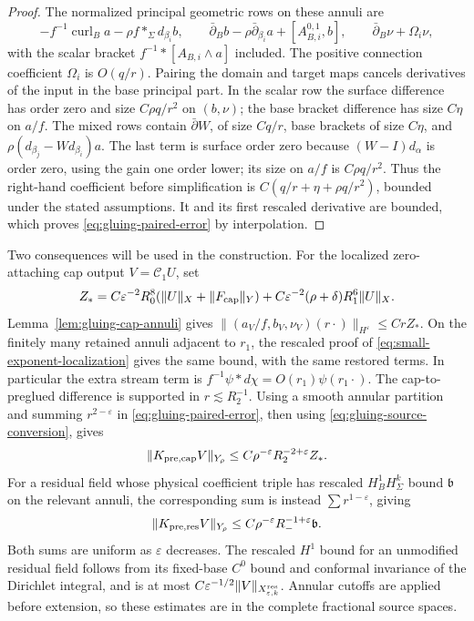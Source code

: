 \documentclass[11pt]{amsart}
\theoremstyle{definition}
\theoremstyle{remark}
\theoremstyle{plain}
\begin{document}
\begin{proof}
The normalized principal geometric rows on these annuli are
\[
 -f^{-1}\operatorname{curl}_B a-\rho f *_\Sigma d_{\beta_i}b,
 \qquad
 \bar\partial_Bb-\rho\bar\partial_{\beta_i}a+[A_{B,i}^{0,1},b],
 \qquad \bar\partial_B\nu+\Omega_i\nu,
\]
with the scalar bracket $f^{-1}*[A_{B,i}\wedge a]$ included.
The positive connection coefficient $\Omega_i$ is $O(q/r)$.
Pairing the domain and target maps cancels derivatives of the input
in the base principal part. In the scalar row the surface difference
has order zero and size $C\rho q/r^2$ on $(b,\nu)$; the
base bracket difference has size $C\eta$ on $a/f$.
The mixed rows contain $\bar\partial W$, of size $Cq/r$,
base brackets of size $C\eta$, and
$\rho(d_{\beta_j}-Wd_{\beta_i})a$.
The last term is surface order zero because $(W-I)d_\alpha$
is order zero, using the gain one order lower; its size on $a/f$
is $C\rho q/r^2$. Thus the right-hand coefficient before
simplification is
$C(q/r+\eta+\rho q/r^2)$, bounded under the stated assumptions.
It and its first rescaled derivative are bounded, which proves
\eqref{eq:gluing-paired-error} by interpolation.
\end{proof}

Two consequences will be used in the construction. For the localized
zero-attaching cap output $V=\mathcal C_1U$, set
\[
 Z_* =C\varepsilon^{-2}R_0^8(\|U\|_X+\|F_{\rm cap}\|_Y)
             +C\varepsilon^{-2}(\rho+\delta)R_1^6\|U\|_X.
\]
Lemma~\ref{lem:gluing-cap-annuli} gives
$\|(a_V/f,b_V,\nu_V)(r\cdot)\|_{H^\varepsilon}\leq CrZ_*$.
On the finitely many retained annuli adjacent to $r_1$, the
rescaled proof of \eqref{eq:small-exponent-localization} gives
the same bound, with the same restored terms. In particular the
extra stream term is $f^{-1}\psi*d\chi=O(r_1)\psi(r_1\cdot)$.
The cap-to-preglued difference is supported in $r\lesssim R_2^{-1}$.
Using a smooth annular partition and summing $r^{2-\varepsilon}$
in \eqref{eq:gluing-paired-error}, then using
\eqref{eq:gluing-source-conversion}, gives
\begin{equation}\label{eq:gluing-cap-background-source}
                 \|K_{{\rm pre},{\rm cap}}V\|_{Y_\rho}
                         \leq C\rho^{-\varepsilon}R_2^{-2+\varepsilon}Z_*.
\end{equation}
For a residual field whose physical coefficient triple has rescaled
$H^1_BH^k_\Sigma$ bound $\mathfrak b$ on the relevant annuli,
the corresponding sum is instead $\sum r^{1-\varepsilon}$,
giving
\begin{equation}\label{eq:gluing-residual-background-source}
                 \|K_{{\rm pre},{\rm res}}V\|_{Y_\rho}
                    \leq C\rho^{-\varepsilon}R_-^{-1+\varepsilon}\mathfrak b.
\end{equation}
Both sums are uniform as $\varepsilon$ decreases. The rescaled
$H^1$ bound for an unmodified residual field follows from its
fixed-base $C^0$ bound and conformal invariance of the Dirichlet
integral, and is at most
$C\varepsilon^{-1/2}\|V\|_{X^{\rm res}_{\varepsilon,k}}$.
Annular cutoffs are applied before extension, so these estimates
are in the complete fractional source spaces.
\end{document}
